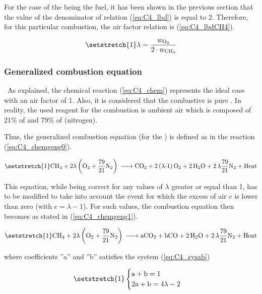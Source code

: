 For the case of the  being the fuel, it has been shown in the previous section that the value of the denominator of relation (\ref{eq:C4_lbd}) is equal to 2. Therefore, for this particular combustion, the air factor relation is (\ref{eq:C4_lbdCH4}).


\begin{equation}
    \setstretch{1}
    \lambda = \frac{w_{\ce{O2}}}{2\cdot w_{\ce{CH4}}}\label{eq:C4_lbdCH4}
\end{equation}

\subsubsection{Generalized combustion equation}
\quad\ As explained, the chemical reaction (\ref{eq:C4_chem}) represents the ideal case with an air factor of 1. Also, it is considered that the combustive is pure . In reality, the used reagent for the combustion is ambient air which is composed of 21\% of  and 79\% of  (nitrogen).

Thus, the generalized combustion equation (for the ) is defined as in the reaction (\ref{eq:C4_chemgeng0}).

\begin{equation}
    \setstretch{1}
    \ce{CH4 +}2\lambda \left(\ce{O2}+\frac{79}{21}\ce{N2}\right) \ce{-> CO2 + 2(\lambda-1)O2 + 2H2O + 2\lambda\frac{79}{21}N2 + \text{Heat}}\label{eq:C4_chemgeng0}
\end{equation}

This equation, while being correct for any values of \(\lambda\) greater or equal than 1, has to be modified to take into account the event for which the excess of air \(e\) is lower than zero (with \(e=\lambda -1\)). For such values, the combustion equation then becomes as stated in (\ref{eq:C4_chemgeng1}).

\begin{equation}
    \setstretch{1}
    \ce{CH4 +}2\lambda \left(\ce{O2}+\frac{79}{21}\ce{N2}\right) \ce{-> aCO2 + bCO + 2H2O + 2\lambda\frac{79}{21}N2 + \text{Heat}}\label{eq:C4_chemgeng1}
\end{equation}

where coefficients ''a'' and ''b'' satisfies the system (\ref{eq:C4_sysab})

\begin{equation}
    \setstretch{1}
    \begin{cases}
        \text{a} + \text{b} = 1 \\
        2\text{a} + \text{b} = 4\lambda - 2
    \end{cases}\label{eq:C4_sysab}
\end{equation}

